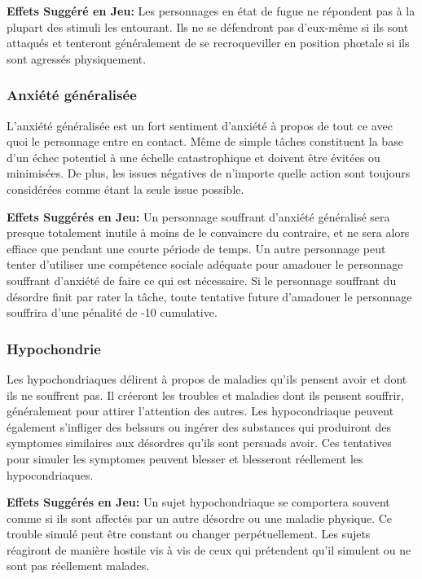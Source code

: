 \textbf{Effets Suggéré en Jeu:} Les personnages en état de fugue ne répondent pas à la plupart des stimuli les entourant. Ils ne se défendront pas d'eux-même si ils sont attaqués et tenteront généralement de se recroqueviller en position phœtale si ils sont agressés physiquement. 

\subsubsection{Anxiété généralisée} 

L'anxiété généralisée est un fort sentiment d'anxiété à propos de tout ce avec quoi le personnage entre en contact. Même de simple tâches constituent la base d'un échec potentiel à une échelle catastrophique et doivent être évitées ou minimisées. De plus, les issues négatives de n'importe quelle action sont toujours considérées comme étant la seule issue possible. 

\textbf{Effets Suggérés en Jeu:} Un personnage souffrant d'anxiété généralisé sera presque totalement inutile à moins de le convaincre du contraire, et ne sera alors effiace que pendant une courte période de temps. Un autre personnage peut tenter d'utiliser une compétence sociale adéquate pour amadouer le personnage souffrant d'anxiété de faire ce qui est nécessaire. Si le personnage souffrant du désordre finit par rater la tâche, toute tentative future d'amadouer le personnage souffrira d'une pénalité de -10 cumulative. 

\subsubsection{Hypochondrie} 

Les hypochondriaques délirent à propos de maladies qu'ils pensent avoir et dont ils ne souffrent pas. Il créeront les troubles et maladies dont ils pensent souffrir, généralement pour attirer l'attention des autres. Les hypocondriaque peuvent également s'infliger des belssurs ou ingérer des substances qui produiront des symptomes similaires aux désordres qu'ils sont persuads avoir. Ces tentatives pour simuler les symptomes peuvent blesser et blesseront réellement les hypocondriaques. 

\textbf{Effets Suggérés en Jeu:} Un sujet hypochondriaque se comportera souvent comme si ils sont affectés par un autre désordre ou une maladie physique. Ce trouble simulé peut être constant ou changer perpétuellement. Les sujets réagiront de manière hostile vis à vis de ceux qui prétendent qu'il simulent ou ne sont pas réellement malades. 

